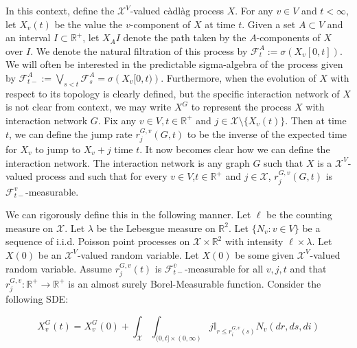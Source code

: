 \documentclass[12pt]{article}
\newcommand{\mb}{\mathbb}
\newcommand{\mc}{\mathcal}
\newcommand{\ra}{\rightarrow}
\newcommand{\ov}{\overline}
\newcommand{\ind}{\hspace{24pt}}
\newcommand{\defeq}{:=}								%
\newcommand{\sta}{\mc{X}}							%
\newcommand{\cl}[1]{\ov{#1}}						%
\newcommand{\Xf}{X}									%
\newcommand{\poiss}{N}								%
\newcommand{\leb}{\lambda}							%
\newcommand{\Sm}{\ell}								%
\newcommand{\rate}{r}								%
\newcommand{\F}{\mc{F}}								%
\newcommand{\poissv}[1]{_{#1}}						%
\newcommand{\vind}[1]{_{#1}}						%
\newcommand{\tme}[1]{(#1)}							%
\newcommand{\tmi}[1]{#1}							%
\newcommand{\gind}[1]{^#1}							%
\newcommand{\vpara}[1]{^{#1}}						%
\newcommand{\stpara}[1]{_{#1}}						%
\newcommand{\tpara}[1]{_{#1}}						%
\newcommand{\gvpara}[2]{^{#1,#2}}					%
\begin{document}
In this context, define the \(\sta^V\)-valued c\`adl\`ag process \(\Xf\). For any \(v \in V\) and \(t < \infty\), let \(\Xf\vind{v}\tme{t}\) be the value the \(v\)-component of \(\Xf\) at time \(t\). Given a set \(A\subset V\) and an interval \(I \subset \mb{R}^+\), let \(\Xf\vind{A}\tmi{I}\) denote the path taken by the \(A\)-components of \(\Xf\) over \(\tmi{I}\). We denote the natural filtration of this process by \(\F\vpara{A}\tpara{t} \defeq \sigma \left(\Xf\vind{v}\tmi{[0,t]}\right)\). We will often be interested in the predictable sigma-algebra of the process given by \(\F\vpara{A}\tpara{t-} \defeq \bigvee_{s < t} \F\vpara{A}\tpara{s} = \sigma\left(\Xf\vind{v}\tmi{[0,t)}\right)\). Furthermore, when the evolution of \(\Xf\) with respect to its topology is clearly defined, but the specific interaction network of \(\Xf\) is not clear from context, we may write \(\Xf\gind{G}\) to represent the process \(\Xf\) with interaction network \(G\). Fix any \(v \in V,t \in \mb{R}^+\) and \(j \in \sta\setminus\{\Xf\vind{v}\tme{t}\}\). Then at time \(t\), we can define the jump rate \(\rate\gvpara{G}{v}\stpara{j}(G,t)\) to be the inverse of the expected time for \(\Xf\vind{v}\) to jump to \(\Xf\vind{v} + j\) time \(t\). It now becomes clear how we can define the interaction network. The interaction network is any graph \(G\) such that \(\Xf\) is a \(\sta^V\)-valued process and such that for every \(v \in V\),\(t\in \mb{R}^+\) and \(j \in \sta\), \(\rate\gvpara{G}{v}\stpara{j}(G,t)\) is \(\F\vpara{v}\tpara{t-}\)-measurable. 

\ind We can rigorously define this in the following manner. Let \(\Sm\) be the counting measure on \(\sta\). Let \(\leb\) be the Lebesgue measure on \(\mb{R}^2\). Let \(\{\poiss\poissv{v}:v \in V\}\) be a sequence of i.i.d. Poisson point processes on \(\sta\times \mb{R}^2\) with intensity \(\Sm\times \leb\). Let \(\Xf\tme{0}\) be an \(\sta^V\)-valued random variable. Let \(\Xf\tme{0}\) be some given \(\sta^V\)-valued random variable. Assume \(\rate\gvpara{G}{v}\stpara{j}(t)\) is \(\F\vpara{\cl{v}}\tpara{t-}\)-measurable for all \(v,j,t\) and that \(\rate\gvpara{G}{v}\stpara{j}:\mb{R}^+ \ra\mb{R}^+\) is an almost surely Borel-Measurable function. Consider the following SDE:

\begin{equation}
\Xf\gind{G}\vind{v}\tme{t} = \Xf\gind{G}\vind{v}\tme{0} + \int_{\sta}\int_{(0,t]\times (0,\infty)} j\mb{I}_{r \leq \rate\gvpara{G}{v}\stpara{i}(s)} \poiss\poissv{v}\left(dr,ds,di\right)
\label{p::not::Xf}
\end{equation}
\end{document}
